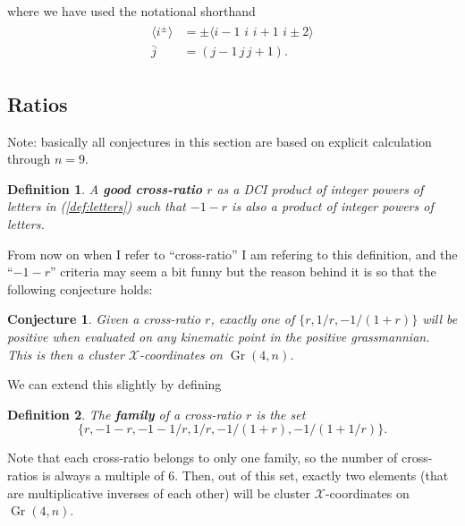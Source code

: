 \documentclass[12pt]{article}
\DeclareMathOperator{\Gr}{Gr}
\def\ket#1{\langle #1 \rangle}
\newtheorem{definition}{Definition}
\newtheorem{conjecture}{Conjecture}
\begin{document}
where we have used the notational shorthand
\begin{align}
\begin{split}
\ket{i^{\pm}}&=\pm\ket{i-1\,\,i\,\,i+1\,\,i\pm2}\\
\bar{j}&=(j-1\,j\,j+1).
\end{split}
\end{align}

\subsection*{Ratios}

Note: basically all conjectures in this section are based on explicit calculation through $n=9$.

\begin{definition} 
A \textbf{good cross-ratio} $r$ as a DCI product of integer powers of letters in (\ref{def:letters}) such that $-1-r$ is also a product of integer powers of letters. 
\end{definition}

From now on when I refer to ``cross-ratio'' I am refering to this definition, and the ``$-1-r$'' criteria may seem a bit funny but the reason behind it is so that the following conjecture holds:
\begin{conjecture}
Given a cross-ratio $r$, exactly one of $\{r,1/r,-1/(1+r)\}$ will be positive when evaluated on any kinematic point in the positive grassmannian. This is then a cluster $\mathcal{X}$-coordinates on $\Gr(4,n)$.
\end{conjecture}
We can extend this slightly by defining
\begin{definition}
The \textbf{family} of a cross-ratio $r$ is the set
\begin{equation}
\{ r, -1 - r, -1 - 1/r, 1/r, -1/(1+r), -1/(1+1/r) \}.
\end{equation}
\end{definition}
Note that each cross-ratio belongs to only one family, so the number of cross-ratios is always a multiple of 6. Then, out of this set, exactly two elements (that are multiplicative inverses of each other) will be cluster $\mathcal{X}$-coordinates on $\Gr(4,n)$. 
\end{document}
